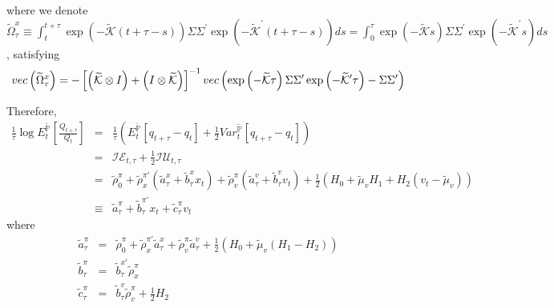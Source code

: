 \documentclass{article}
\begin{document}
where we denote $\widetilde{\Omega }_{\tau }^{x}\equiv \int_{t}^{t+\tau
}\exp \left( -\widetilde{\mathcal{K}}\left( t+\tau -s\right) \right) \Sigma
\Sigma ^{\prime }\exp \left( -\widetilde{\mathcal{K}}^{\prime }\left( t+\tau
-s\right) \right) ds=\int_{0}^{\tau }\exp \left( -\widetilde{\mathcal{K}}%
s\right) \Sigma \Sigma ^{\prime }\exp \left( -\widetilde{\mathcal{K}}%
^{\prime }s\right) ds$, satisfying%
\begin{equation*}
vec\left( \widetilde{\Omega }_{\tau }^{x}\right) =-\left[ \left( \widetilde{%
\mathcal{K}}\otimes I\right) +\left( I\otimes \widetilde{\mathcal{K}}\right) %
\right] ^{-1}vec\left( \exp \left( -\widetilde{\mathcal{K}}\tau \right)
\Sigma \Sigma ^{\prime }\exp \left( -\widetilde{\mathcal{K}}^{\prime }\tau
\right) -\Sigma \Sigma ^{\prime }\right) 
\end{equation*}

Therefore,%
\begin{eqnarray*}
\frac{1}{\tau }\log E_{t}^{\mathbb{\tilde{P}}}\left[ \frac{Q_{t+\tau }}{Q_{t}%
}\right]  &=&\frac{1}{\tau }\left( E_{t}^{\mathbb{\tilde{P}}}\left[
q_{t+\tau }-q_{t}\right] +\frac{1}{2}Var_{t}^{\mathbb{\tilde{P}}}\left[
q_{t+\tau }-q_{t}\right] \right)  \\
&=&\mathcal{IE}_{t,\tau }+\frac{1}{2}\mathcal{IU}_{t,\tau } \\
&=&\widetilde{\rho }_{0}^{\pi }+\widetilde{\rho }_{x}^{\pi \prime }\left( 
\tilde{a}_{\tau }^{x}+\tilde{b}_{\tau }^{x}x_{t}\right) +\widetilde{\rho }%
_{v}^{\pi }\left( \tilde{a}_{\tau }^{v}+\tilde{b}_{\tau }^{v}v_{t}\right) +%
\frac{1}{2}\left( H_{0}+\widetilde{\mu }_{v}H_{1}+H_{2}\left( v_{t}-%
\widetilde{\mu }_{v}\right) \right)  \\
&\equiv &\tilde{a}_{\tau }^{\pi }+\tilde{b}_{\tau }^{\pi \prime }x_{t}+%
\widetilde{c}_{\tau }^{\pi }v_{t}
\end{eqnarray*}%
where 
\begin{eqnarray*}
\tilde{a}_{\tau }^{\pi } &=&\widetilde{\rho }_{0}^{\pi }+\widetilde{\rho }%
_{x}^{\pi \prime }\tilde{a}_{\tau }^{x}+\widetilde{\rho }_{v}^{\pi }\tilde{a}%
_{\tau }^{v}+\frac{1}{2}\left( H_{0}+\widetilde{\mu }_{v}\left(
H_{1}-H_{2}\right) \right)  \\
\tilde{b}_{\tau }^{\pi } &=&\tilde{b}_{\tau }^{x\prime }\widetilde{\rho }%
_{x}^{\pi } \\
\widetilde{c}_{\tau }^{\pi } &=&\tilde{b}_{\tau }^{v}\widetilde{\rho }%
_{v}^{\pi }+\frac{1}{2}H_{2}
\end{eqnarray*}
\end{document}
